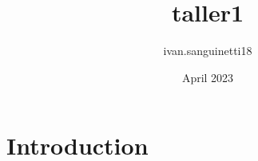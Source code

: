 \documentclass{article}
\title{taller1}
\author{ivan.sanguinetti18 }
\date{April 2023}
\begin{document}
\maketitle

\section{Introduction}
\end{document}

